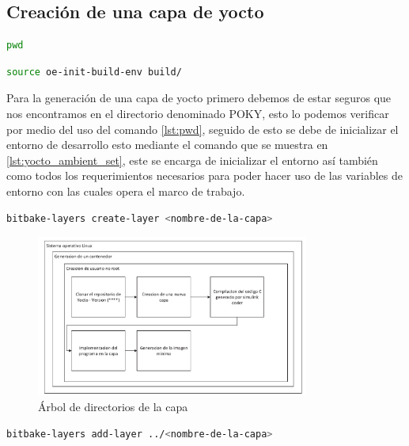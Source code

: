 \subsection{Creación de una capa de yocto}

\begin{lstlisting}[language=bash, caption={"Print Working Directory",Linux}, label=lst:pwd]
    pwd
\end{lstlisting}

\begin{lstlisting}[language=bash, caption={Inicializar ambiente, Yocto}, label=lst:yocto_ambient_set]
    source oe-init-build-env build/
\end{lstlisting}

Para la generación de una capa de yocto primero debemos de estar seguros que nos encontramos en el directorio denominado POKY, esto lo podemos verificar por medio del uso del comando \ref{lst:pwd}, seguido de esto se debe de inicializar el entorno de desarrollo esto mediante el comando que se muestra en \ref{lst:yocto_ambient_set}, este se encarga de inicializar el entorno así también como todos los requerimientos necesarios para poder hacer uso de las variables de entorno con las cuales opera el marco de trabajo.

\begin{lstlisting}[language=bash, caption={Generar nueva capa, Yocto }, label=lst:yocto_new_layer]
    bitbake-layers create-layer <nombre-de-la-capa>
\end{lstlisting}

\begin{figure}[h!]
    \centering
    \includegraphics[width=0.8\textwidth]{fig/especifico_2/Flujo de trabajo de mi idea.pdf}
    \caption{Árbol de directorios de la capa}
    \label{fig:arbol_capa_custom_yocto}
\end{figure}

\begin{lstlisting}[language=bash, caption={Agregar nueva capa, Yocto }, label=lst:add_new_layer]
    bitbake-layers add-layer ../<nombre-de-la-capa>
\end{lstlisting}

